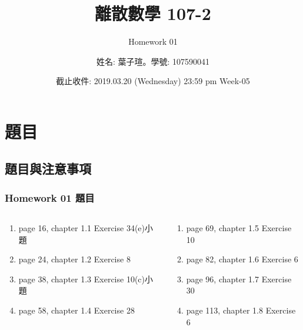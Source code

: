 \documentclass[14pt,hyperref={bookmarks=false}]{beamer}
\title{離散數學 107-2}
\subtitle{Homework 01}
\author{姓名: 葉子瑄。學號: 107590041}
\date{截止收件: 2019.03.20 (Wednesday) 23:59 pm Week-05}
\begin{document}

\begin{frame}
\titlepage
\end{frame}

\raggedright

\begin{frame}
\footnotesize
\tableofcontents
\end{frame}
	
\section{題目}

	\subsection{題目與注意事項}
	
	\begin{frame}
	\frametitle{Homework 01 題目}
	\fontsize{6pt}{7pt}\selectfont
	\setlength{\baselineskip}{5pt}
	\begin{columns}
	\begin{column}{0.49\textwidth}
	\begin{enumerate}[label=(Prob. \arabic*)]
	\setlength\itemsep{0em}
	\item page 16, chapter 1.1 Exercise 34(e)小題
	\item page 24, chapter 1.2 Exercise 8
	\item page 38, chapter 1.3 Exercise 10(c)小題
	\item page 58, chapter 1.4 Exercise 28
	\end{enumerate}
	\end{column}
	
	\begin{column}{0.49\textwidth}
	\begin{enumerate}[label=(Prob. \arabic*)]
	\addtocounter{enumi}{4}
	\setlength\itemsep{0em}
	\item page 69, chapter 1.5 Exercise 10
	\item page 82, chapter 1.6 Exercise 6
	\item page 96, chapter 1.7 Exercise 30
	\item page 113, chapter 1.8 Exercise 6
	\end{enumerate}
	\end{column}
	
	\end{columns}
	\end{frame}
	
\end{document}
